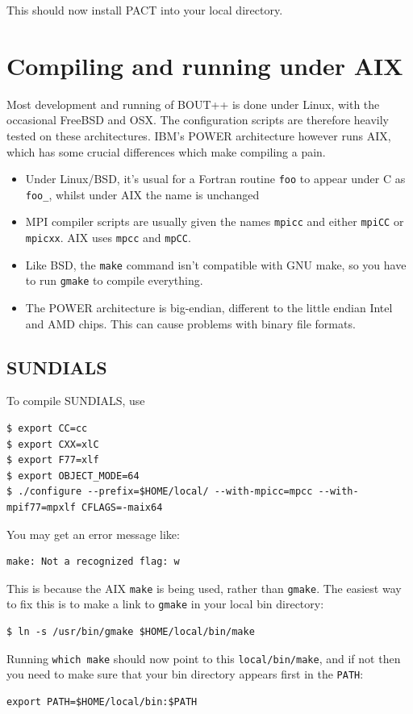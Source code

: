 \documentclass[12pt]{article}
\newcommand{\code}[1]{\texttt{#1}}
\begin{document}
This should now install PACT into your local directory.

\section{Compiling and running under AIX}

Most development and running of BOUT++ is done under Linux, with the occasional FreeBSD and OSX.
The configuration scripts are therefore heavily tested on these architectures. IBM's POWER
architecture however runs AIX, which has some crucial differences which make compiling a pain.

\begin{itemize}
\item Under Linux/BSD, it's usual for a Fortran routine \code{foo} to appear
  under C as \code{foo\_}, whilst under AIX the name is unchanged
\item MPI compiler scripts are usually given the names \code{mpicc} and
  either \code{mpiCC} or \code{mpicxx}. AIX uses \code{mpcc} and \code{mpCC}.
\item Like BSD, the \code{make} command isn't compatible with GNU make,
  so you have to run \code{gmake} to compile everything.
\item The POWER architecture is big-endian, different to the little endian
  Intel and AMD chips. This can cause problems with binary file formats.
\end{itemize}

\subsection{SUNDIALS}

To compile SUNDIALS, use
\begin{verbatim}
$ export CC=cc
$ export CXX=xlC
$ export F77=xlf
$ export OBJECT_MODE=64
$ ./configure --prefix=$HOME/local/ --with-mpicc=mpcc --with-mpif77=mpxlf CFLAGS=-maix64
\end{verbatim}

You may get an error message like:
\begin{verbatim}
make: Not a recognized flag: w
\end{verbatim}
This is because the AIX \code{make} is being used, rather than \code{gmake}.
The easiest way to fix this is to make a link to \code{gmake} in your local
bin directory:
\begin{verbatim}
$ ln -s /usr/bin/gmake $HOME/local/bin/make
\end{verbatim}
Running \code{which make} should now point to this \code{local/bin/make},
and if not then you need to make sure that your bin directory appears first
in the \code{PATH}:
\begin{verbatim}
export PATH=$HOME/local/bin:$PATH
\end{verbatim}
\end{document}
